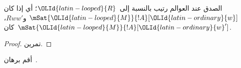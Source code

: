 \documentclass[../../../include/open-logic-section]{subfiles}
\begin{document}
\begin{prop}
  الصدق عند العوالم رتيب بالنسبة إلى~$\OLId{latin-looped}{R}$؛ أي إذا كان
  $\mSat{\OLId{latin-looped}{M}}{!A}[\OLId{latin-ordinary}{w}]$ و$Rww'$، كان~$\mSat{\OLId{latin-looped}{M}}{!A}[\OLId{latin-ordinary}{w}']$.
\end{prop}

\begin{proof}
  تمرين.
\end{proof}

\begin{prob}
  أقم برهان~.
\end{prob}
\end{document}
